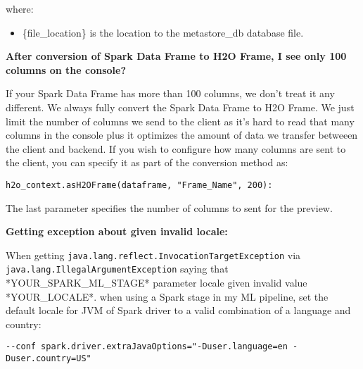 where:
\begin{itemize}
\item \{file\_location\} is the location to the metastore\_db database file.
\end{itemize}

\textbf{After conversion of Spark Data Frame to H2O Frame, I see only 100 columns on the console?}

If your Spark Data Frame has more than 100 columns, we don't treat it any different. We always fully convert
the Spark Data Frame to H2O Frame. We just limit the number of columns we send to the client as it's hard to read that
many columns in the console plus it optimizes the amount of data we transfer betweeen the client and backend.
If you wish to configure how many columns are sent to the client, you can specify it as part of the conversion method as:

\begin{lstlisting}[style=Python]
h2o_context.asH2OFrame(dataframe, "Frame_Name", 200):
\end{lstlisting}

The last parameter specifies the number of columns to sent for the preview.

\textbf{Getting exception about given invalid locale:}

When getting \texttt{java.lang.reflect.InvocationTargetException} via \texttt{java.lang.IllegalArgumentException} saying that \\
*YOUR\_SPARK\_ML\_STAGE* parameter locale given invalid value *YOUR\_LOCALE*. when using a Spark stage in my ML pipeline,
set the default locale for JVM of Spark driver to a valid combination of a language and country:

\begin{lstlisting}[style=Bash]
--conf spark.driver.extraJavaOptions="-Duser.language=en -Duser.country=US"
\end{lstlisting}
